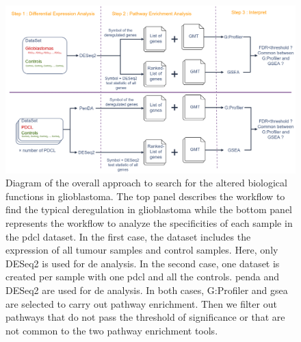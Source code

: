 \begin{figure}
    \centering
    \includegraphics[width=\textwidth]{img/workflow-diagram}
    \caption{
        Diagram of the overall approach to search for the altered biological functions in glioblastoma.
        The top panel describes the workflow to find the typical deregulation in glioblastoma while the bottom panel represents the workflow to analyze the specificities of each sample in the \acrshort{pdcl} dataset.
        In the first case, the dataset includes the expression of all tumour samples and control samples.
        Here, only DESeq2 is used for \acrlong{de} analysis.
        In the second case, one dataset is created per sample with one \acrshort{pdcl} and all the controls.
        \acrshort{penda} and DESeq2 are used for \acrlong{de} analysis.
        In both cases, G:Profiler and \acrshort{gsea} are selected to carry out pathway enrichment.
        Then we filter out pathways that do not pass the threshold of significance or that are not common to the two pathway enrichment tools.
    }
    \label{fig:workflow-diagram-global}
\end{figure}

